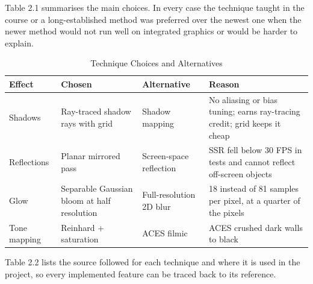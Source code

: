 \documentclass[12pt, a4paper]{report}
\begin{document}
\begin{justify}
  {\fontsize{12}{13.8}\selectfont
    Table 2.1 summarises the main choices. In every case the technique taught in the course or a long-established method was preferred over the newest one when the newer method would not run well on integrated graphics or would be harder to explain.
  }
\end{justify}

\begin{table}[!htbp]
  \caption{Technique Choices and Alternatives}
  \label{tab:2.1}
  \centering
  {\fontsize{10}{13}\selectfont
    \begin{tabular}{|p{1.0in}|p{1.45in}|p{1.3in}|p{1.65in}|}
      \hline
      \textbf{Effect} & \textbf{Chosen} & \textbf{Alternative} & \textbf{Reason} \\
      \hline
      Shadows & Ray-traced shadow rays with grid & Shadow mapping & No aliasing or bias tuning; earns ray-tracing credit; grid keeps it cheap \\
      \hline
      Reflections & Planar mirrored pass & Screen-space reflection & SSR fell below 30 FPS in tests and cannot reflect off-screen objects \\
      \hline
      Glow & Separable Gaussian bloom at half resolution & Full-resolution 2D blur & 18 instead of 81 samples per pixel, at a quarter of the pixels \\
      \hline
      Tone mapping & Reinhard + saturation & ACES filmic & ACES crushed dark walls to black \\
      \hline
    \end{tabular}
  }
\end{table}

\begin{justify}
  {\fontsize{12}{13.8}\selectfont
    Table 2.2 lists the source followed for each technique and where it is used in the project, so every implemented feature can be traced back to its reference.
  }
\end{justify}
\end{document}
